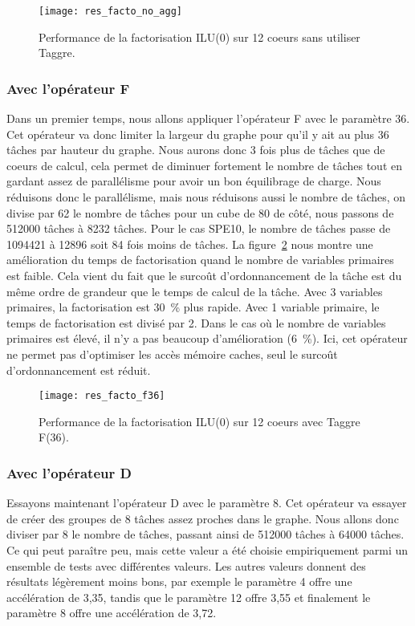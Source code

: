 \begin{figure}[!h]
  \centering
  \texttt{[image: res\_facto\_no\_agg]}
  \caption{Performance de la factorisation ILU(0) sur 12 coeurs sans utiliser Taggre.}
  \label{fig:res_facto_no_agg}
\end{figure}


\subsubsection{Avec l'opérateur F}
Dans un premier temps, nous allons appliquer l'opérateur F avec le paramètre 36.
%
Cet opérateur va donc limiter la largeur du graphe pour qu'il y ait au plus 36 tâches par hauteur du graphe.
%
Nous aurons donc 3 fois plus de tâches que de coeurs de calcul, cela permet de diminuer fortement le nombre de tâches tout en gardant assez de parallélisme pour avoir un bon équilibrage de charge.
%
Nous réduisons donc le parallélisme, mais nous réduisons aussi le nombre de tâches, on divise par 62 le nombre de tâches pour un cube de 80 de côté, nous passons de 512000 tâches à 8232 tâches.
%
Pour le cas SPE10, le nombre de tâches passe de 1094421 à 12896 soit 84 fois moins de tâches.
%
La figure~\ref{fig:res_facto_f36} nous montre une amélioration du temps de factorisation quand le nombre de variables primaires est faible.
%
Cela vient du fait que le surcoût d'ordonnancement de la tâche est du même ordre de grandeur que le temps de calcul de la tâche.
%
Avec 3 variables primaires, la factorisation est 30~\% plus rapide.
%
Avec 1 variable primaire, le temps de factorisation est divisé par 2.
%
Dans le cas où le nombre de variables primaires est élevé, il n'y a pas beaucoup d'amélioration (6~\%).
%
Ici, cet opérateur ne permet pas d'optimiser les accès mémoire caches, seul le surcoût d'ordonnancement est réduit.

\begin{figure}[!h]
  \centering
  \texttt{[image: res\_facto\_f36]}
  \caption{Performance de la factorisation ILU(0) sur 12 coeurs avec Taggre F(36).}
  \label{fig:res_facto_f36}
\end{figure}


\subsubsection{Avec l'opérateur D}
Essayons maintenant l'opérateur D avec le paramètre 8.
%
Cet opérateur va essayer de créer des groupes de 8 tâches assez proches dans le graphe.
%
Nous allons donc diviser par 8 le nombre de tâches, passant ainsi de 512000 tâches à 64000 tâches.
%
Ce qui peut paraître peu, mais cette valeur a été choisie empiriquement parmi un ensemble de tests avec différentes valeurs.
%
Les autres valeurs donnent des résultats légèrement moins bons, par exemple le paramètre 4 offre une accélération de 3,35, tandis que le paramètre 12 offre 3,55 et finalement le paramètre 8 offre une accélération de 3,72.


